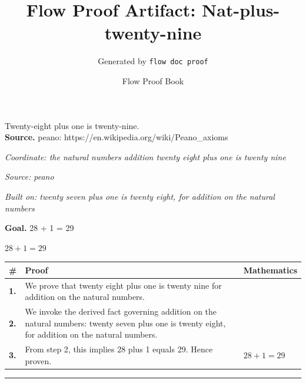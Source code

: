 \documentclass[11pt]{article}
\title{Flow Proof Artifact: Nat-plus-twenty-nine}
\author{Generated by \texttt{flow doc proof}}
\date{Flow Proof Book}
\theoremstyle{definition}
\begin{document}
\maketitle
Twenty-eight plus one is twenty-nine.\\[0.5em]
\textbf{Source.} peano: https://en.wikipedia.org/wiki/Peano\_axioms\\[0.5em]
\bigskip
{}\par
\smallskip\noindent\textit{Coordinate: the natural numbers \cdot addition \cdot twenty eight plus one is twenty nine}\par
\smallskip\noindent\textit{Source: peano}\par
\smallskip\noindent\textit{Built on: twenty seven plus one is twenty eight, for addition on the natural numbers}\par
\medskip
\noindent\textbf{Goal.} 28 + 1 = 29\par
\noindent$\displaystyle 28 + 1 = 29$\par
\medskip
\noindent
\begin{tabular}{@{} >{\raggedright\arraybackslash}p{} >{\raggedright\arraybackslash}p{} >{\raggedleft\arraybackslash}p{} @{}}
\textbf{\#} & \textbf{Proof} & \textbf{Mathematics} \\
\midrule
\textbf{1.} & We prove that twenty eight plus one is twenty nine for addition on the natural numbers. & \\[0.45em]
\textbf{2.} & We invoke the derived fact governing addition on the natural numbers: twenty seven plus one is twenty eight, for addition on the natural numbers. & \\[0.45em]
\textbf{3.} & From step 2, this implies 28 plus 1 equals 29. Hence proven. & $\displaystyle 28 + 1 = 29$ \\[0.45em]
\bottomrule
\end{tabular}
\label{thm:Nat-addition-twenty_eight_plus_one_is_twenty_nine}
\par\medskip\hrule
\end{document}
